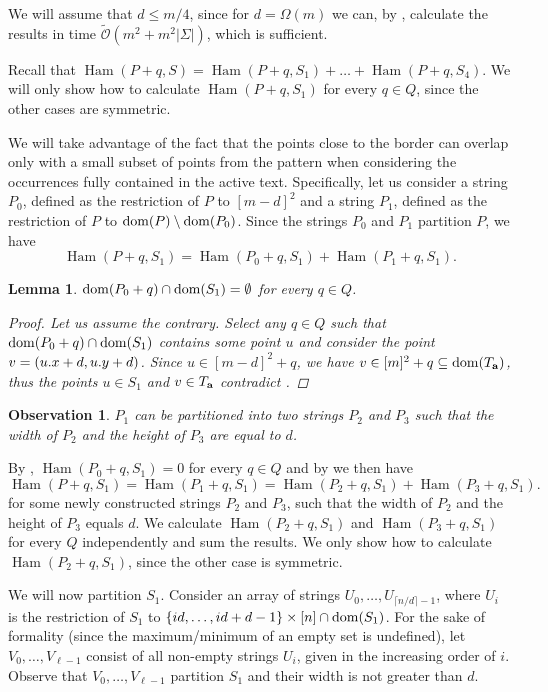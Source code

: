 \documentclass[11pt]{article}
\newcommand{\tO}{\tilde{\mathcal{O}}}
\newcommand{\set}[1]{\left\lbrace #1 \right\rbrace}
\theoremstyle{plain}
\newtheorem{lemma}{Lemma}
\newtheorem{observation}{Observation}
\theoremstyle{definition}
\theoremstyle{remark}
\DeclareMathOperator*{\Ham}{Ham}
\begin{document}
We will assume that $d \le m / 4$, since for $d = \Omega(m)$ we can, by , calculate the results in time $\tO(m^2 + m^2|\Sigma|)$, which is sufficient.

Recall that 
$\Ham(P + q, S) = \Ham(P + q, S_1) + \dots + \Ham(P + q, S_4)$.
We will only show how to calculate $\Ham(P + q, S_1)$ for every $q \in Q$, since the other cases are symmetric.

We will take advantage of the fact that the points close to the border can overlap only with a small subset of points from the pattern when considering the occurrences fully contained in the active text.
Specifically, let us consider a string $P_0$, defined as the restriction of $P$ to $[m - d]^2$ and a string $P_1$, defined as the restriction of $P$ to $\operatorname*{dom}(P) \setminus \operatorname*{dom}(P_0)$.
Since the strings $P_0$ and $P_1$ partition $P$, we have
$$ \Ham(P + q, S_1) = \Ham(P_0 + q, S_1) + \Ham(P_1 + q, S_1).$$

\begin{lemma}\label{border_hamming_reduction}
	$\operatorname*{dom}(P_0 + q) \cap \operatorname*{dom}(S_1) = \emptyset$ for every $q \in Q$.
	\begin{proof}
		Let us assume the contrary.
		Select any $q \in Q$ such that $\operatorname*{dom}(P_0 + q) \cap \operatorname*{dom}(S_1)$ 
		contains some point $u$ and consider the point $v = (u.x + d, u.y + d)$.
		Since $u \in [m - d]^2 + q$, we have $v \in [m]^2 + q \subseteq \operatorname*{dom}(T_\mathbf{a})$, thus the points $u \in S_1$ and $v \in T_\mathbf{a}$ contradict .
	\end{proof}
\end{lemma}

\begin{observation}\label{border_hamming_split}
	$P_1$ can be partitioned into two strings $P_2$ and $P_3$ such that the width of $P_2$ and the height of $P_3$ are equal to $d$.
\end{observation}

By , $\Ham(P_0 + q, S_1) = 0$ for every $q \in Q$
and by  we then have 
$$\Ham(P + q, S_1) = \Ham(P_1 + q, S_1) = \Ham(P_2 + q, S_1) + \Ham(P_3 + q, S_1). $$
for some newly constructed strings $P_2$ and $P_3$, such that the width of $P_2$ and the height of $P_3$ equals $d$.
We calculate $\Ham(P_2 + q, S_1)$ and $\Ham(P_3 + q, S_1)$ for every $Q$ independently and sum the results.
We only show how to calculate $\Ham(P_2 + q, S_1)$, since the other case is symmetric.

We will now partition $S_1$.
Consider an array of strings $U_0, \dots, U_{\lceil n / d \rceil - 1}$, where $U_i$ is the restriction of $S_1$ to $\set{id, \dots, id + d - 1} \times [n] \cap \d{S_1}$.
For the sake of formality (since the maximum/minimum of an empty set is undefined), let $V_0, \dots, V_{\ell - 1}$ consist of all non-empty strings $U_i$, given in the increasing order of $i$.
Observe that $V_0, \dots, V_{\ell - 1}$ partition $S_1$ and their width is not greater than $d$.
\end{document}
